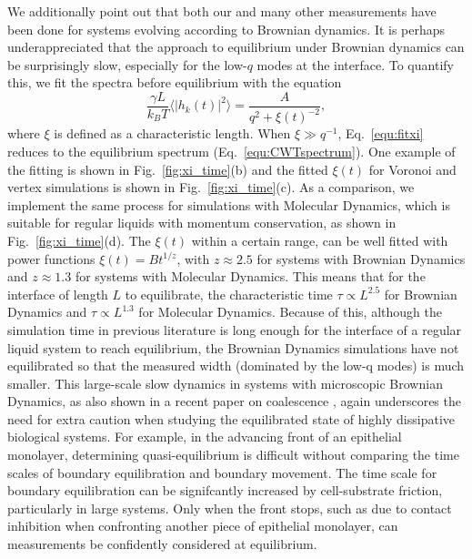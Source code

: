 \documentclass[twoside,twocolumn,9pt]{article}
\begin{document}
We additionally point out that both our and many other measurements have been done for systems evolving according to Brownian dynamics. It is perhaps underappreciated that the approach to equilibrium under Brownian dynamics can be surprisingly slow, especially for the low-$q$ modes at the interface. To quantify this, we fit the spectra before equilibrium with the equation 
\begin{equation}
    \frac{\gamma L}{k_B T}\langle |h_k(t)|^2\rangle = \frac{A}{q^2+\xi(t)^{-2}}, 
    \label{equ:fitxi}
\end{equation}
where $\xi$ is defined as a characteristic length. When $\xi \gg q^{-1}$, Eq.~\ref{equ:fitxi} reduces to the equilibrium spectrum (Eq.~\ref{equ:CWTspectrum}). One example of the fitting is shown in Fig.~\ref{fig:xi_time}(b) and the fitted $\xi(t)$ for Voronoi and vertex simulations is shown in Fig.~\ref{fig:xi_time}(c). As a comparison, we implement the same process for simulations with Molecular Dynamics, which is suitable for regular liquids with momentum conservation, as shown in Fig.~\ref{fig:xi_time}(d). The $\xi(t)$ within a certain range, can be well fitted with power functions $\xi(t)=Bt^{1/z}$, with $z\approx 2.5$ for systems with Brownian Dynamics and $z\approx 1.3$ for systems with Molecular Dynamics. This means that for the interface of length $L$ to equilibrate, the characteristic time $\tau \propto L^{2.5}$ for Brownian Dynamics and $\tau \propto L^{1.3}$ for Molecular Dynamics. Because of this, although the simulation time in previous literature \cite{sussman2018soft} is long enough for the interface of a regular liquid system to reach equilibrium, the Brownian Dynamics simulations have not equilibrated so that the measured width (dominated by the low-q modes) is much smaller. This large-scale slow dynamics in systems with microscopic Brownian Dynamics, as also shown in a recent paper on coalescence \cite{yue2024coalescing}, again underscores the need for extra caution when studying the equilibrated state of highly dissipative biological systems. For example, in the advancing front of an epithelial monolayer, determining quasi-equilibrium is difficult without comparing the time scales of boundary equilibration and boundary movement. The time scale for boundary equilibration can be signifcantly increased by cell-substrate friction, particularly in large systems. Only when the front stops, such as due to contact inhibition when confronting another piece of epithelial monolayer, can measurements be confidently considered at equilibrium.  
\end{document}
